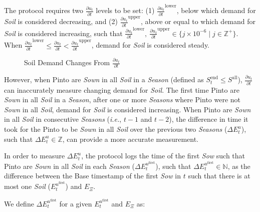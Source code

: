 \documentclass[tikz]{article}
\newcommand{\term}[1]{\textsl{#1}}
\begin{document}
The protocol requires two $\frac{\partial u_{t}}{\partial t}$ levels to be set: (1) $\frac{\partial u_{t}}{\partial t}^{\text{lower}}$, below which demand for \term{Soil} is considered decreasing, and (2) $\frac{\partial u_{t}}{\partial t}^{\text{upper}}$, above or equal to which demand for \term{Soil} is considered increasing, such that $\frac{\partial u_{t}}{\partial t}^{\text{lower}},\ \frac{\partial u_{t}}{\partial t}^{\text{upper}} \in \{j \times 10^{-6} \mid j \in \mathbb{Z}^{+} \}$. When $\frac{\partial u_{t}}{\partial t}^{\text{lower}} \leq \frac{\partial u_{t}}{\partial t} < \frac{\partial u_{t}}{\partial t}^{\text{upper}}$, demand for \term{Soil} is considered steady.


\vspace*{-3.5mm}
\begin{figure}[h!]
    \centering
    
    \vspace*{-10.5mm}
    \caption{Soil Demand Changes From $\frac{\partial u_{t}}{\partial t}$}
    \label{Soil Demand Changes From Derivative}
\end{figure}

However, when Pinto are \term{Sown} in all \term{Soil} in a \term{Season} (defined as $S_{t}^{\text{end}} \leq S^{\text{all}}$), $\frac{\partial u_{t}}{\partial t}$ can inaccurately measure changing demand for \term{Soil}. The first time Pinto are \term{Sown} in all \term{Soil} in a \term{Season}, after one or more \term{Seasons} where Pinto were not \term{Sown} in all \term{Soil}, demand for \term{Soil} is considered increasing. When Pinto are \term{Sown} in all \term{Soil} in consecutive \term{Seasons} (\textit{i.e.}, $t-1$ and $t-2$), the difference in time it took for the Pinto to be \term{Sown} in all \term{Soil} over the previous two \term{Seasons} ($\Delta E_{t}^{u}$), such that $\Delta E_{t}^{u} \in \mathbb{Z}$, can provide a more accurate measurement. 

In order to measure $\Delta E_{t}^{u}$, the protocol logs the time of the first \term{Sow} such that Pinto are \term{Sown} in all \term{Soil} in each \term{Season} ($\Delta E_{t}^{u^{\text{first}}}$), such that $\Delta E_{t}^{u^{\text{first}}} \in \mathbb{N}$, as the difference between the Base timestamp of the first \term{Sow} in $t$ such that there is at most one \term{Soil} ($E_{t}^{u^{\text{first}}}$) and $E_{\Xi}$. 

We define $\Delta E_{t}^{u^{\text{first}}}$ for a given $E_{t}^{u^{\text{first}}}$ and $E_{\Xi}$ as:
\end{document}
